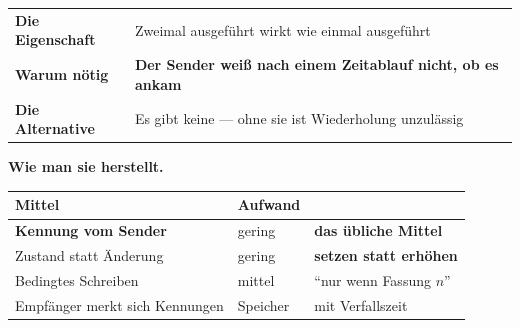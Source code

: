 \begin{merksatz}
\begin{center}
\renewcommand{\arraystretch}{1.55}
\begin{tabular}{@{}P{2.8cm}P{6.0cm}@{}}
\toprule
\textbf{Die Eigenschaft} & Zweimal ausgeführt wirkt wie einmal ausgeführt\\
\textbf{Warum nötig} & \textbf{Der Sender weiß nach einem Zeitablauf nicht, ob es ankam}\\
\textbf{Die Alternative} & Es gibt keine --- ohne sie ist Wiederholung unzulässig\\
\bottomrule
\end{tabular}
\end{center}

\begin{center}
\begin{minipage}{0.88\textwidth}
\end{minipage}
\end{center}

\textbf{Wie man sie herstellt.}

\begin{center}
{\small
\renewcommand{\arraystretch}{1.5}
\begin{tabular}{@{}P{3.0cm}P{2.4cm}P{2.6cm}@{}}
\toprule
\textbf{Mittel} & \textbf{Aufwand} & \\
\midrule
\textbf{Kennung vom Sender} & \textcolor{gruen}{gering} & \textcolor{gruen}{\textbf{das übliche Mittel}}\\
Zustand statt Änderung & \textcolor{gruen}{gering} & \textbf{setzen statt erhöhen}\\
Bedingtes Schreiben & mittel & \enquote{nur wenn Fassung $n$}\\
Empfänger merkt sich Kennungen & \textcolor{akzent}{Speicher} & \textcolor{akzent}{mit Verfallszeit}\\
\bottomrule
\end{tabular}}
\end{center}

\begin{center}
\end{center}


\end{merksatz}
